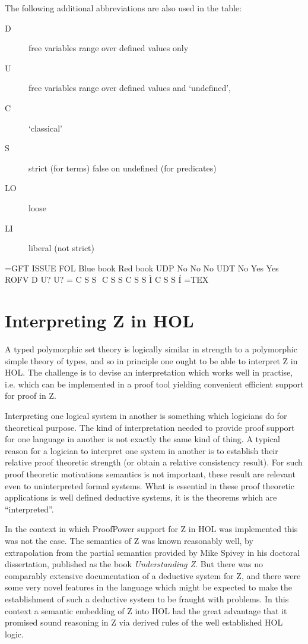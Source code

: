 \documentclass[10pt,titlepage]{book}
\begin{document}
The following additional abbreviations are also used in the table:
\begin{description}
\item[D] free variables range over defined values only
\item[U] free variables range over defined values and `undefined',
\item[C] `classical'
\item[S] strict (for terms) false on undefined (for predicates)
\item[LO] loose
\item[LI] liberal (not strict)
\end{description}

=GFT
ISSUE	FOL	Blue book	Red book
UDP	No	No		No
UDT	No	Yes		Yes
ROFV	D	U?		U?
=	C	S		S
	C	S		S
{}	C	S		S
Ì	C	S		S
Í	
=TEX


\section{Interpreting Z in HOL}

A typed polymorphic set theory is logically similar in strength to a polymorphic simple theory of types, and so in principle one ought to be able to interpret Z in HOL.
The challenge is to devise an interpretation which works well in practise, i.e. which can be implemented in a proof tool yielding convenient efficient support for proof in Z.

Interpreting one logical system in another is something which logicians do for theoretical purpose.
The kind of interpretation needed to provide proof support for one language in another is not exactly the same kind of thing.
A typical reason for a logician to interpret one system in another is to establish their relative proof theoretic strength (or obtain a relative consistency result).
For such proof theoretic motivations semantics is not important, these result are relevant even to uninterpreted formal systems.
What is essential in these proof theoretic applications is well defined deductive systems, it is the theorems which are ``interpreted''.

In the context in which ProofPower support for Z in HOL was implemented this was not the case.
The semantics of Z was known reasonably well, by extrapolation from the partial semantics provided by Mike Spivey in his doctoral dissertation, published as the book {\it Understanding Z}\cite{spivey88}. 
But there was no comparably extensive documentation of a deductive system for Z, and there were some very novel features in the language which might be expected to make the establishment of such a deductive system to be fraught with problems.
In this context a semantic embedding of Z into HOL had the great advantage that it promised sound reasoning in Z via derived rules of the well established HOL logic.
\end{document}
